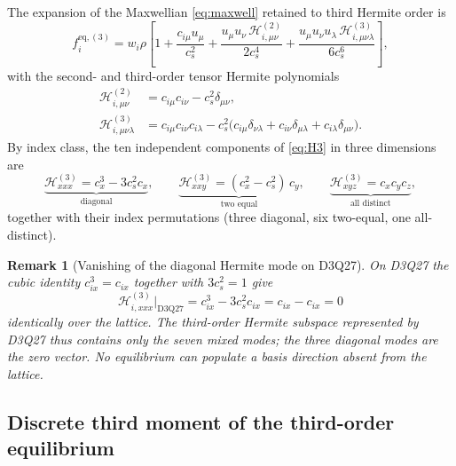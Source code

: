 \documentclass[preprint,11pt]{elsarticle}
\newtheorem{remark}{Remark}
\newcommand{\cs}{c_s}
\newcommand{\eq}{\mathrm{eq}}
\begin{document}
The expansion of the Maxwellian \eqref{eq:maxwell} retained to third Hermite
order is \citep{Grad1949,HeLuo1997,ShanYuanChen2006}
\begin{equation}
f_i^{\eq,(3)}
= w_i\rho\left[
1
+\frac{c_{i\mu}u_\mu}{\cs^{2}}
+\frac{u_\mu u_\nu\,\mathcal{H}^{(2)}_{i,\mu\nu}}{2\cs^{4}}
+\frac{u_\mu u_\nu u_\lambda\,\mathcal{H}^{(3)}_{i,\mu\nu\lambda}}{6\cs^{6}}
\right],
\label{eq:feq3}
\end{equation}
with the second- and third-order tensor Hermite polynomials
\begin{align}
\mathcal{H}^{(2)}_{i,\mu\nu}&=c_{i\mu}c_{i\nu}-\cs^{2}\delta_{\mu\nu},
\label{eq:H2}\\
\mathcal{H}^{(3)}_{i,\mu\nu\lambda}&=c_{i\mu}c_{i\nu}c_{i\lambda}
-\cs^{2}\big(c_{i\mu}\delta_{\nu\lambda}+c_{i\nu}\delta_{\mu\lambda}
+c_{i\lambda}\delta_{\mu\nu}\big).
\label{eq:H3}
\end{align}
By index class, the ten independent components of \eqref{eq:H3} in three
dimensions are
\begin{equation}
\underbrace{\mathcal{H}^{(3)}_{xxx}=c_x^{3}-3\cs^{2}c_x}_{\text{diagonal}},
\qquad
\underbrace{\mathcal{H}^{(3)}_{xxy}=(c_x^{2}-\cs^{2})\,c_y}_{\text{two equal}},
\qquad
\underbrace{\mathcal{H}^{(3)}_{xyz}=c_xc_yc_z}_{\text{all distinct}},
\label{eq:H3components}
\end{equation}
together with their index permutations (three diagonal, six two-equal, one
all-distinct).

\begin{remark}[Vanishing of the diagonal Hermite mode on D3Q27]
\label{rem:H3vanish}
On D3Q27 the cubic identity $c_{ix}^{3}=c_{ix}$ together with $3\cs^{2}=1$ give
\begin{equation}
\mathcal{H}^{(3)}_{i,xxx}\big|_{\text{D3Q27}}
=c_{ix}^{3}-3\cs^{2}c_{ix}=c_{ix}-c_{ix}=0
\label{eq:H3xxxzero}
\end{equation}
identically over the lattice. The third-order Hermite subspace represented by
D3Q27 thus contains only the seven mixed modes; the three diagonal modes are the
zero vector. No equilibrium can populate a basis direction absent from the
lattice.
\end{remark}

\subsection{Discrete third moment of the third-order equilibrium}
\label{sec:disc3-order3}
\end{document}
